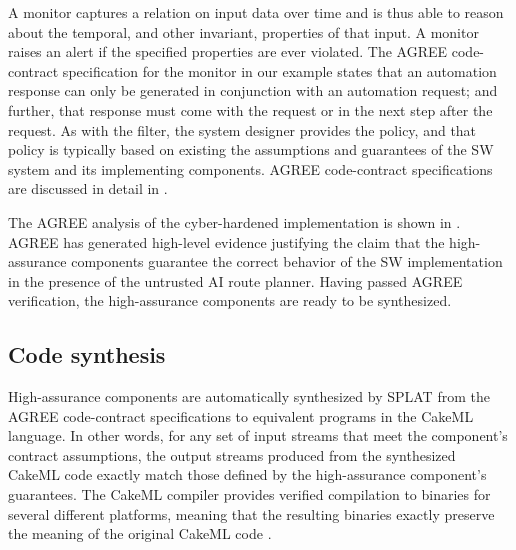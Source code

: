 A monitor captures a relation on input data over time and is thus able
to reason about the temporal, and other invariant, properties of that input.  A monitor raises
an alert if the specified properties are ever violated.  The
AGREE code-contract specification for the monitor in our example states that an
automation response can only be generated in conjunction with an
automation request; and further, that response must come with the
request or in the next step after the request.  As with the filter,
the system designer provides the policy, and that policy is typically
based on existing the assumptions and guarantees of the SW system and its implementing components.
AGREE code-contract specifications are discussed in detail in .

The AGREE analysis of the cyber-hardened implementation is shown in
. AGREE has generated high-level
evidence justifying the claim that the high-assurance components
guarantee the correct behavior of the SW implementation in the
presence of the untrusted AI route planner.  Having passed AGREE
verification, the high-assurance components are ready to be
synthesized.

\subsection{Code synthesis}
High-assurance components are automatically synthesized by SPLAT from
the AGREE code-contract specifications to equivalent programs in the CakeML
language.
 In other words, for any set of input streams that meet the
 component's contract assumptions, the output streams produced from
 the synthesized CakeML code exactly match those defined by the
 high-assurance component's guarantees.  The CakeML compiler provides
 verified compilation to binaries for several different platforms,
 meaning that the resulting binaries exactly preserve the meaning of
 the original CakeML code \cite{cakeml}.

